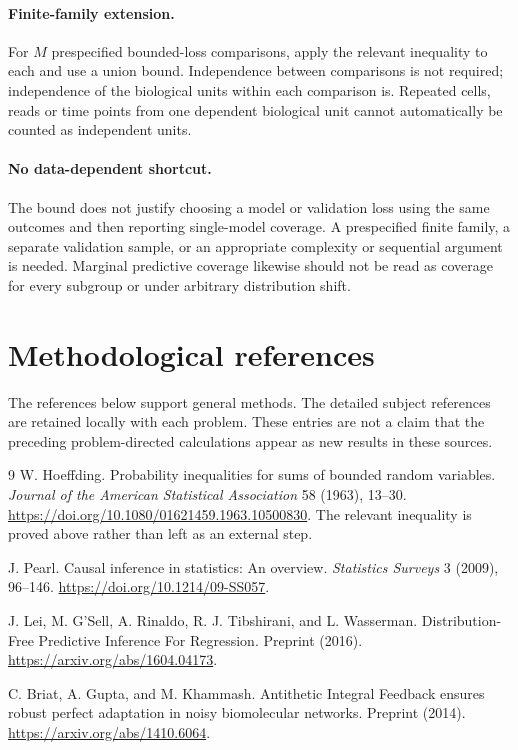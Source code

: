 \documentclass[11pt]{article}
\begin{document}
\paragraph{Finite-family extension.}
For $M$ prespecified bounded-loss comparisons, apply the relevant inequality to
each and use a union bound. Independence between comparisons is not required;
independence of the biological units within each comparison is. Repeated cells,
reads or time points from one dependent biological unit cannot automatically be
counted as independent units.

\paragraph{No data-dependent shortcut.}
The bound does not justify choosing a model or validation loss using the same
outcomes and then reporting single-model coverage. A prespecified finite family,
a separate validation sample, or an appropriate complexity or sequential argument
is needed. Marginal predictive coverage likewise should not be read as coverage
for every subgroup or under arbitrary distribution shift.


\section{Methodological references}
The references below support general methods. The detailed subject references
are retained locally with each problem. These entries are not a claim that the
preceding problem-directed calculations appear as new results in these sources.
\begin{thebibliography}{9}
W. Hoeffding. Probability inequalities for sums of bounded random variables.
\emph{Journal of the American Statistical Association} 58 (1963), 13--30.
\url{https://doi.org/10.1080/01621459.1963.10500830}.
The relevant inequality is proved above rather than left as an external step.

J. Pearl. Causal inference in statistics: An overview.
\emph{Statistics Surveys} 3 (2009), 96--146.
\url{https://doi.org/10.1214/09-SS057}.

J. Lei, M. G'Sell, A. Rinaldo, R. J. Tibshirani, and L. Wasserman.
Distribution-Free Predictive Inference For Regression. Preprint (2016).
\url{https://arxiv.org/abs/1604.04173}.

C. Briat, A. Gupta, and M. Khammash.
Antithetic Integral Feedback ensures robust perfect adaptation in noisy
biomolecular networks. Preprint (2014).
\url{https://arxiv.org/abs/1410.6064}.
\end{thebibliography}
\end{document}
